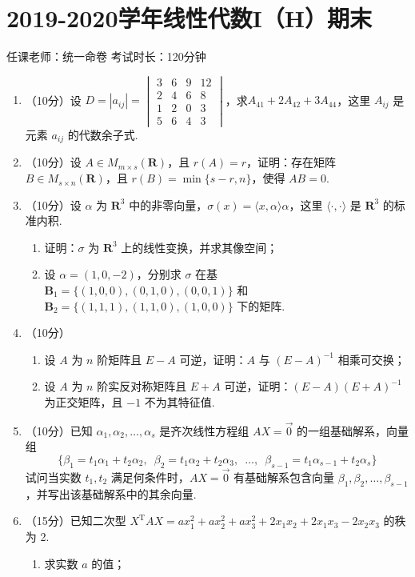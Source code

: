 \section{2019-2020学年线性代数I（H）期末}

\begin{center}
    任课老师：统一命卷\hspace{4em} 考试时长：120分钟
\end{center}

\begin{enumerate}
    \item （10分）设 $D=|a_{ij}|=\begin{vmatrix}3 & 6 & 9 & 12 \\ 2 & 4 & 6 & 8 \\1 & 2 & 0 & 3 \\ 5 & 6 & 4 & 3\end{vmatrix}$，求$A_{41}+2A_{42}+3A_{44}$，这里 $A_{ij}$ 是元素 $a_{ij}$ 的代数余子式.
	\item （10分）设 $A \in M_{m \times s}(\mathbf{R})$，且 $r(A)=r$，证明：存在矩阵 $B \in M_{s \times n}(\mathbf{R})$，且 $r(B)=\min\{s-r, n\}$，使得 $AB=0$.
	\item （10分）设 $\alpha$ 为 $\mathbf{R}^3$ 中的非零向量，$\sigma(x)=\langle x, \alpha\rangle \alpha$，这里 $\langle\cdot, \cdot\rangle$ 是 $\mathbf{R}^3$ 的标准内积.
    \begin{enumerate}
        \item 证明：$\sigma$ 为 $\mathbf{R}^3$ 上的线性变换，并求其像空间；

        \item 设 $\alpha=(1, 0, -2)$，分别求 $\sigma$ 在基 $\mathbf{B}_1=\{(1, 0, 0), (0, 1, 0), (0, 0, 1)\}$ 和 $\mathbf{B}_2=\{(1, 1, 1), (1, 1, 0), (1, 0, 0)\}$ 下的矩阵.
    \end{enumerate}
	\item （10分）
    \begin{enumerate}
        \item 设 $A$ 为 $n$ 阶矩阵且 $E-A$ 可逆，证明：$A$ 与 $(E-A)^{-1}$ 相乘可交换；

        \item 设 $A$ 为 $n$ 阶实反对称矩阵且 $E+A$ 可逆，证明：$(E-A)(E+A)^{-1}$ 为正交矩阵，且 $-1$ 不为其特征值.
    \end{enumerate}
	\item （10分）已知 $\alpha_1,\alpha_2,\ldots,\alpha_s$ 是齐次线性方程组 $AX=\vec{0}$ 的一组基础解系，向量组
    \[\{\beta_1=t_1\alpha_1+t_2\alpha_2,\enspace \beta_2=t_1\alpha_2+t_2\alpha_3,\enspace \ldots,\enspace \beta_{s-1}=t_1\alpha_{s-1}+t_2\alpha_s\}\]
    试问当实数 $t_1,t_2$ 满足何条件时，$AX=\vec{0}$ 有基础解系包含向量 $\beta_1,\beta_2,\ldots,\beta_{s-1}$，并写出该基础解系中的其余向量.
	\item （15分）已知二次型 $X^{\mathrm{T}}AX=ax_1^2+ax_2^2+ax_3^2+2x_1x_2+2x_1x_3-2x_2x_3$ 的秩为 2.
    \begin{enumerate}
        \item 求实数 $a$ 的值；


\end{enumerate}
\end{enumerate}

